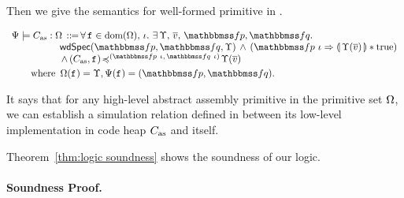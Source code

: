 Then we give the semantics for well-formed primitive in
\Def{\ref{def:wdprim-sem}}.
\begin{definition}
    \em
    \label{def:wdprim-sem}
    \small
    \[
        \begin{array}{l}
            \semWdPrim{\Cspec}{\asmimp}{\hprimset}
            \, \define \,
            \forall \, \lab{} \in \dom(\hprimset), \,
            \lgvl. \
            \exists \, \hprim, \, \args{\val}, \,
            \relspecpre, \relspecpost.  \\
            \hspace*{5em}
            \wdSpec{\relspecpre}{\relspecpost} {\hprim}
            	\, \land \,
            	(\relspecpre \ \lgvl \Rightarrow
            	\safePrimAst{\, \hprim(\args{\val}) \,}
                \sepstar \atrue) \\
            \hspace*{5em}
            \, \land \,
            \simFunction{(\asmimp, \lab{})}
                {(\relspecpre \ \lgvl, \,
                    \relspecpost \ \lgvl)}
                {\hprim(\args{\val})}
            \\
            \\[-9pt]
            \hspace*{2em}
            \TYPE{where } \,
            \hprimset(\lab{}) = \hprim,
            \Cspec(\lab{}) = (\relspecpre, \relspecpost).
        \end{array}
    \]
\end{definition}
It says that for any high-level
abstract assembly primitive
in the primitive set $\Omega$,
we can establish a simulation relation
defined in \Def{\ref{def:simfunc}}
between its low-level implementation
in code heap $C_{\text{as}}$ and itself.

Theorem~\ref{thm:logic soundness}
shows the soundness of our logic.

\paragraph{Soundness Proof.} 

